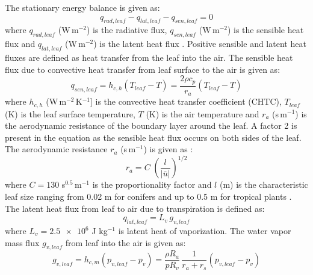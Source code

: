 The stationary energy balance is given as:
\begin{equation}
{q_{\mathit{rad},\mathit{leaf}}} - {q_{\mathit{lat},\mathit{leaf}}} - {q_{\mathit{sen},\mathit{leaf}}} = 0
\label{eq:energybalance}
\end{equation}
where ${q_{\mathit{rad},\mathit{leaf}}}$ (W\,m$^{-2}$) is the radiative flux, ${q_{\mathit{sen},\mathit{leaf}}}$ (W\,m$^{-2}$) is the sensible heat flux and ${q_{\mathit{lat},\mathit{leaf}}}$ (W\,m$^{-2}$) is the latent heat flux \citep{Majdoubi2009, Bruse1998, Dauzat2001,Hiraoka2005}. Positive sensible and latent heat fluxes are defined as heat transfer from the leaf into the air. The sensible heat flux due to convective heat transfer from leaf surface to the air is given as:
\begin{equation}
{q_{\mathit{sen,leaf}}} = {h_{c,h}} \left( {{T_{\mathit{leaf}}} - T} \right) = \frac{{2\rho {c_p}}}{{{r_a}}} \left( {{T_{\mathit{leaf}}} - T} \right)
\label{eq:sensibleheatflux}
\end{equation}
where $h_{c,h}$ (W\,m$^{-2}$\,K$^{-1}$] is the convective heat transfer coefficient (CHTC), $T_{\mathit{leaf}}$ (K) is the leaf surface temperature, $T$ (K) is the air temperature and $r_a$ (s\,m$^{-1}$) is the aerodynamic resistance of the boundary layer around the leaf. A factor 2 is present in the equation as the sensible heat flux occurs on both sides of the leaf. The aerodynamic resistance $r_a$ (s\,m$^{-1}$) is given as \citep{Dauzat2001, Robitu2006}:
\begin{equation}
{r_a} = C\;{\left( {\frac{l}{{\left| {\bar u} \right|}}} \right)^{1/2}}
\label{eq:ra}
\end{equation}
where $C=130$ s$^{0.5}$\,m$^{-1}$ is the proportionality factor and $l$ (m) is the characteristic leaf size ranging from 0.02 m for conifers and up to 0.5 m for tropical plants \citep{Bruse1998}. The latent heat flux from leaf to air due to transpiration is defined as:
\begin{equation}
{q_{lat,leaf}} = {L_v} \, {g_{v,leaf}}
\label{eq:latentheatflux}
\end{equation}
where $L_v=\num{2.5e6}$ J kg$^{-1}$ is latent heat of vaporization. The water vapor mass flux $g_{\mathit{v,leaf}}$ from leaf into the air is given as:
\begin{equation}
{g_{\mathit{v,leaf}}} = {h_{c,m}}\left( {{p_{\mathit{v,leaf}}} - {p_v}} \right) = \frac{{\rho {R_a}}}{{p{R_v}}} \, \frac{1}{{{r_a} + {r_s}}}\left( {{p_{\mathit{v,leaf}}} - {p_v}} \right)
\label{eq:vapourflux}
\end{equation}
